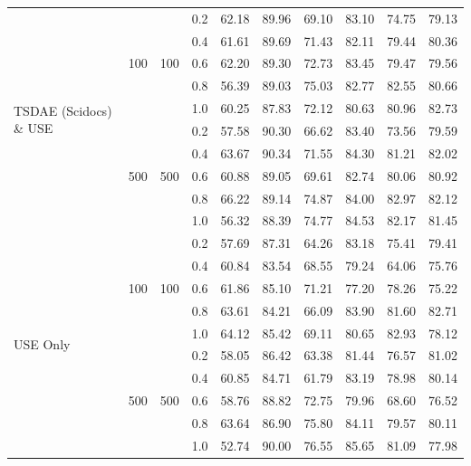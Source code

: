 \documentclass[journal,letterpaper]{IEEEtran}
\begin{document}
\begin{table}[!ht]
\begin{tabular}{l c c c c c c c c c}
\multirow{10}{*}{TSDAE (Scidocs) \& USE}
& \multirow{5}{*}{100} & \multirow{5}{*}{100} & 0.2 & 62.18 & 89.96 & 69.10 & 83.10 & 74.75 & 79.13 \\
& & & 0.4 & 61.61 & 89.69 & 71.43 & 82.11 & 79.44 & 80.36 \\
& & & 0.6 & 62.20 & 89.30 & 72.73 & 83.45 & 79.47 & 79.56 \\
& & & 0.8 & 56.39 & 89.03 & 75.03 & 82.77 & 82.55 & 80.66 \\
& & & 1.0 & 60.25 & 87.83 & 72.12 & 80.63 & 80.96 & 82.73 \\
\addlinespace
& \multirow{5}{*}{500} & \multirow{5}{*}{500} & 0.2 & 57.58 & 90.30 & 66.62 & 83.40 & 73.56 & 79.59 \\
& & & 0.4 & 63.67 & 90.34 & 71.55 & 84.30 & 81.21 & 82.02 \\
& & & 0.6 & 60.88 & 89.05 & 69.61 & 82.74 & 80.06 & 80.92 \\
& & & 0.8 & 66.22 & 89.14 & 74.87 & 84.00 & 82.97 & 82.12 \\
& & & 1.0 & 56.32 & 88.39 & 74.77 & 84.53 & 82.17 & 81.45 \\
\midrule

\multirow{10}{*}{USE Only}
& \multirow{5}{*}{100} & \multirow{5}{*}{100} & 0.2 & 57.69 & 87.31 & 64.26 & 83.18 & 75.41 & 79.41 \\
& & & 0.4 & 60.84 & 83.54 & 68.55 & 79.24 & 64.06 & 75.76 \\
& & & 0.6 & 61.86 & 85.10 & 71.21 & 77.20 & 78.26 & 75.22 \\
& & & 0.8 & 63.61 & 84.21 & 66.09 & 83.90 & 81.60 & 82.71 \\
& & & 1.0 & 64.12 & 85.42 & 69.11 & 80.65 & 82.93 & 78.12 \\
\addlinespace
& \multirow{5}{*}{500} & \multirow{5}{*}{500} & 0.2 & 58.05 & 86.42 & 63.38 & 81.44 & 76.57 & 81.02 \\
& & & 0.4 & 60.85 & 84.71 & 61.79 & 83.19 & 78.98 & 80.14 \\
& & & 0.6 & 58.76 & 88.82 & 72.75 & 79.96 & 68.60 & 76.52 \\
& & & 0.8 & 63.64 & 86.90 & 75.80 & 84.11 & 79.57 & 80.11 \\
& & & 1.0 & 52.74 & 90.00 & 76.55 & 85.65 & 81.09 & 77.98 \\
\bottomrule %
\end{tabular}
\end{table} 
\end{document}
